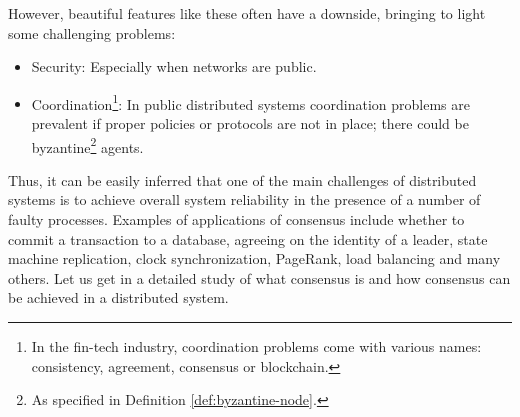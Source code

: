 \bigskip
\noindent
However, beautiful features like these often have a downside, bringing to light some challenging problems:
\begin{itemize}
    \item Security: Especially when networks are public.
    \item Coordination\footnote{In the fin-tech industry, coordination problems come with various names: consistency, agreement, consensus or blockchain.}: In public distributed systems coordination problems are prevalent if proper policies or protocols are not in place; there could be byzantine\footnote{As specified in Definition \ref{def:byzantine-node}.} agents.
\end{itemize}
Thus, it can be easily inferred that one of the main challenges of distributed systems is to achieve overall system reliability in the presence of a number of faulty processes. Examples of applications of consensus include whether to commit a transaction to a database, agreeing on the identity of a leader, state machine replication, clock synchronization, PageRank, load balancing and many others. Let us get in a detailed study of what consensus is and how consensus can be achieved in a distributed system.

\bigskip
